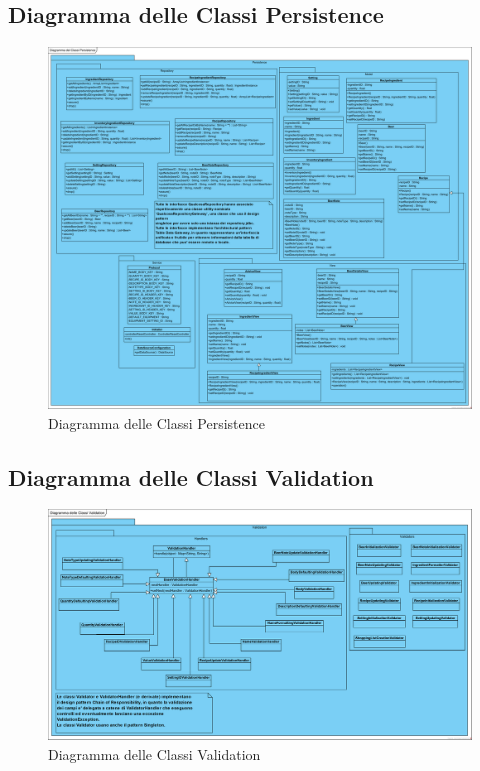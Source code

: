 \documentclass[a4paper,12pt]{report}
\begin{document}
		\subsection{Diagramma delle Classi Persistence}
			\begin{figure}[!h]
				\centering
				\includegraphics[width=01\linewidth]{image/Diagramma-delle-Classi-Persistence.png}
				\caption{Diagramma delle Classi Persistence}\label{fig:1}
			\end{figure}      
\newpage
		\subsection{Diagramma delle Classi Validation}
			\begin{figure}[!h]
				\centering
				\includegraphics[width=01\linewidth]{image/Diagramma-delle-Classi-Validation.png}
				\caption{Diagramma delle Classi Validation}\label{fig:1}
			\end{figure}           
\end{document}
